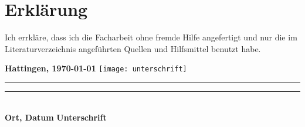 \documentclass[./entry.tex]{subfiles}
\begin{document}
    \chapter{Erklärung}

    Ich errkläre, dass ich die Facharbeit ohne fremde Hilfe angefertigt und nur die
    im Literaturverzeichnis angeführten Quellen und Hilfsmittel benutzt habe.


    \vspace{2cm}
    \noindent\textbf{Hattingen, \today} \hfill \texttt{[image: unterschrift]} \\
    \noindent\rule{5.5cm}{0.4pt} \hfill \rule{5.5cm}{0.4pt} \\
    \textbf{Ort, Datum} \hfill \textbf{Unterschrift}
\end{document}
